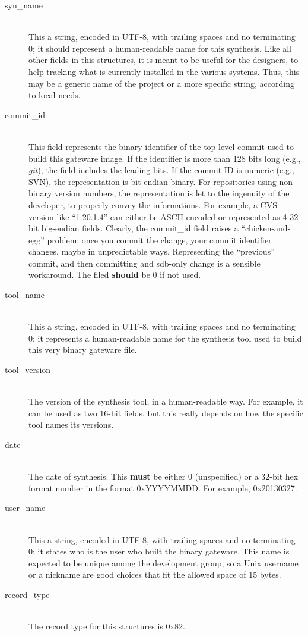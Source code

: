 \documentclass[a4paper, 12pt]{article}
\begin{document}
\begin{description}
\item[syn\_name] \hfill \\
This a string, encoded in  UTF-8, with trailing spaces and no terminating 0;
it should represent a human-readable name for this synthesis. Like all other
fields in this structures, it is meant to be useful for the designers, to help
tracking what is currently installed in the various systems.  Thus, this may
be a generic name of the project or a more specific string, according to local
needs.

\item[commit\_id] \hfill \\
This field represents the binary identifier of the top-level commit used
to build this gateware image. If the identifier is more than 128 bits long
(e.g., \textit{git}), the field includes the leading bits. If the commit ID is numeric
(e.g., SVN), the representation is bit-endian binary. For repositories using
non-binary version numbers, the representation is let to the ingenuity of the
developer, to properly convey the informations. For example, a CVS version
like ``1.20.1.4'' can either be ASCII-encoded or represented as 4 32-bit big-endian
fields.  Clearly, the commit\_id field raises a ``chicken-and-egg'' problem: once
you commit the change, your commit identifier changes, maybe in unpredictable
ways. Representing the ``previous'' commit, and then committing and sdb-only
change is a sensible workaround.  The filed \textbf{should} be 0 if not used.


\item[tool\_name] \hfill \\
This a string, encoded in  UTF-8, with trailing spaces and no terminating 0;
it represents a human-readable name for the synthesis tool used to build this
very binary gateware file.

\item[tool\_version] \hfill \\
The version of the synthesis tool, in a human-readable way. For example,
it can be used as two 16-bit fields, but this really depends on how the specific
tool names its versions.

\item[date] \hfill \\
The date of synthesis.  This \textbf{must} be either 0 (unspecified) or a 32-bit hex
format number in the format 0xYYYYMMDD. For example, 0x20130327.

\item[user\_name] \hfill \\
This a string, encoded in  UTF-8, with trailing spaces and no terminating 0;
it states who is the user who built the binary gateware.  This name is expected
to be unique among the development group, so a Unix username or a nickname are good
choices that fit the allowed space of 15 bytes.

\item[record\_type] \hfill \\
The record type for this structures is 0x82.
\end{description}
\end{document}
